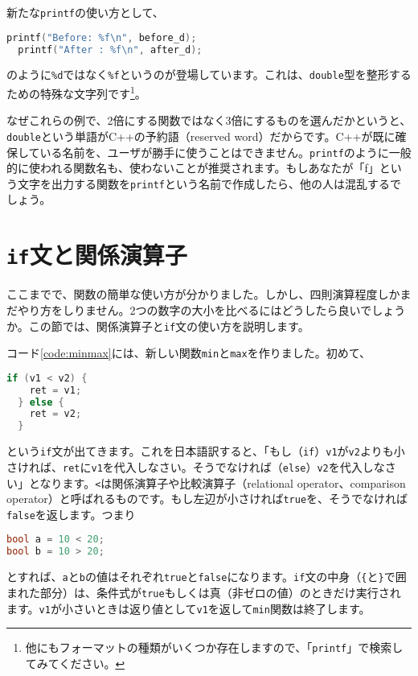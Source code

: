新たな\texttt{printf}の使い方として、
\begin{lstlisting}[language=c++]
  printf("Before: %f\n", before_d); 
  printf("After : %f\n", after_d); 
\end{lstlisting} 
のように\texttt{\%d}ではなく\texttt{\%f}というのが登場しています。これは、\texttt{double}型を整形するための特殊な文字列です\footnote{他にもフォーマットの種類がいくつか存在しますので、「\texttt{printf}」で検索してみてください。}。

なぜこれらの例で、2倍にする関数ではなく3倍にするものを選んだかというと、\texttt{double}という単語がC++の予約語（reserved word）だからです。C++が既に確保している名前を、ユーザが勝手に使うことはできません。\texttt{printf}のように一般的に使われる関数名も、使わないことが推奨されます。もしあなたが「f」という文字を出力する関数を\texttt{printf}という名前で作成したら、他の人は混乱するでしょう。

\section{\texttt{if}文と関係演算子}

ここまでで、関数の簡単な使い方が分かりました。しかし、四則演算程度しかまだやり方をしりません。2つの数字の大小を比べるにはどうしたら良いでしょうか。この節では、関係演算子と\texttt{if}文の使い方を説明します。



コード\ref{code:minmax}には、新しい関数\texttt{min}と\texttt{max}を作りました。初めて、
\begin{lstlisting}[language=c++]
  if (v1 < v2) {
    ret = v1;
  } else {
    ret = v2;
  }
\end{lstlisting}
という\texttt{if}文が出てきます。これを日本語訳すると、「もし（\texttt{if}）\texttt{v1}が\texttt{v2}よりも小さければ、\texttt{ret}に\texttt{v1}を代入しなさい。そうでなければ（\texttt{else}）\texttt{v2}を代入しなさい」となります。\texttt{<}は関係演算子や比較演算子（relational operator、comparison operator）と呼ばれるものです。もし左辺が小さければ\texttt{true}を、そうでなければ\texttt{false}を返します。つまり
\begin{lstlisting}[language=c++]
bool a = 10 < 20;
bool b = 10 > 20;
\end{lstlisting}
とすれば、\texttt{a}と\texttt{b}の値はそれぞれ\texttt{true}と\texttt{false}になります。\texttt{if}文の中身（\texttt{\{}と\texttt{\}}で囲まれた部分）は、条件式が\texttt{true}もしくは真（非ゼロの値）のときだけ実行されます。\texttt{v1}が小さいときは返り値として\texttt{v1}を返して\texttt{min}関数は終了します。

